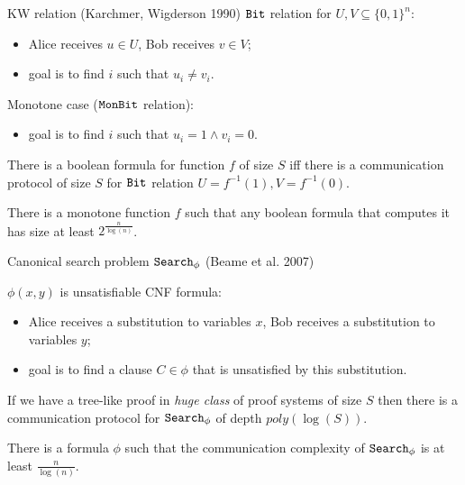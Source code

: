 \begin{frame}{KW relation (Karchmer, Wigderson 1990)}
    $\mathtt{Bit}$ relation for $U, V \subseteq \{0, 1\}^{n}$:
    \begin{itemize}
        \item Alice receives $u \in U$, Bob receives $v \in V$;
        \item goal is to find $i$ such that $u_i \neq v_i$.
    \end{itemize}
    \pause
    Monotone case ($\mathtt{MonBit}$ relation):
    \begin{itemize}
        \item goal is to find $i$ such that $u_i = 1 \land v_i = 0$.
    \end{itemize}

    \pause

    \begin{theorem}
        There is a  boolean formula for function $f$ of size $S$ iff there is a communication
        protocol of size $S$ for $\mathtt{Bit}$  relation $U = f^{-1}(1), V = f^{-1}(0)$.
    \end{theorem}

    \pause
    \pause
    
    \begin{theorem}[Pitassi, G{\"{o}}{\"{o}}s, 2014]
        There is a monotone function $f$ such that any boolean formula that computes it has size at least
        $2^{\frac{n}{\log(n)}}$. 
    \end{theorem}
\end{frame}

\begin{frame}{Canonical search problem $\mathtt{Search}_{\phi}$ (Beame et al. 2007)}
    
    $\phi(x, y)$ is unsatisfiable CNF formula:
    \begin{itemize}
        \item Alice receives a substitution to variables $x$, Bob receives a substitution to variables $y$;
        \item goal is to find a clause $C \in \phi$ that is unsatisfied by this substitution.
    \end{itemize}

    \pause

    \begin{theorem}
        If we have a tree-like proof in \textit{huge class} of proof systems of size $S$ then there is a communication
        protocol for $\mathtt{Search}_{\phi}$ of depth $poly(\log(S))$.
    \end{theorem}

    \pause
    
    \begin{theorem}[Pitassi, G{\"{o}}{\"{o}}s, 2014]
        There is a formula $\phi$ such that the communication complexity of $\mathtt{Search}_{\phi}$ is at least $\frac{n}{\log(n)}$.
    \end{theorem}
\end{frame}

